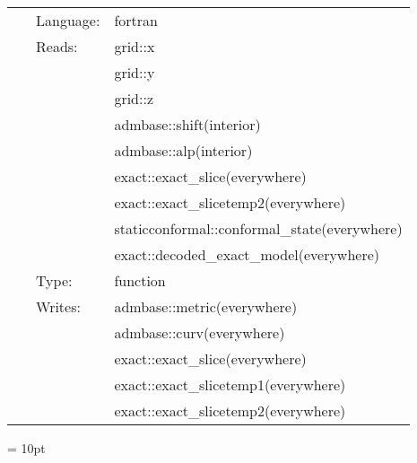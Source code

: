  \begin{tabular*}{160mm}{cll} 
~ & Language:  & fortran \\ 
~ & Reads:  & grid::x \\ 
~& ~ &grid::y\\ 
~& ~ &grid::z\\ 
~& ~ &admbase::shift(interior)\\ 
~& ~ &admbase::alp(interior)\\ 
~& ~ &exact::exact\_slice(everywhere)\\ 
~& ~ &exact::exact\_slicetemp2(everywhere)\\ 
~& ~ &staticconformal::conformal\_state(everywhere)\\ 
~& ~ &exact::decoded\_exact\_model(everywhere)\\ 
~ & Type:  & function \\ 
~ & Writes:  & admbase::metric(everywhere) \\ 
~& ~ &admbase::curv(everywhere)\\ 
~& ~ &exact::exact\_slice(everywhere)\\ 
~& ~ &exact::exact\_slicetemp1(everywhere)\\ 
~& ~ &exact::exact\_slicetemp2(everywhere)\\ 
\end{tabular*} 



\vspace{5mm}\parskip = 10pt 

